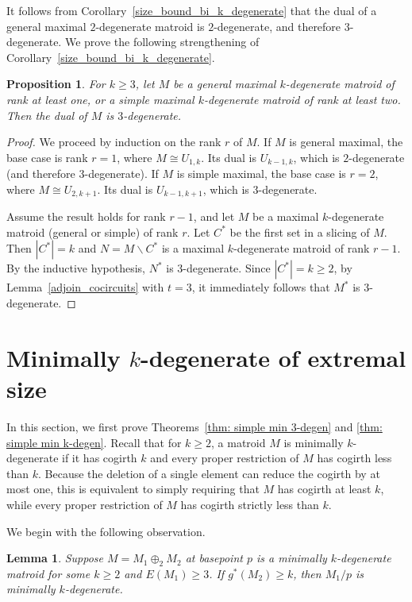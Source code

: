 \documentclass{amsart}
\newcommand{\ba}{\backslash}
\newtheorem{lemma}[theorem]{Lemma}
\newtheorem{proposition}[theorem]{Proposition}
\theoremstyle{definition}
\theoremstyle{remark}
\numberwithin{equation}{section}
\begin{document}
It follows from Corollary~\ref{size_bound_bi_k_degenerate} that the dual of a general maximal $2$-degenerate matroid is $2$-degenerate, and therefore $3$-degenerate. We prove the following strengthening of Corollary~\ref{size_bound_bi_k_degenerate}.

\begin{proposition}
\label{dual_3_degenerate}
For $k \geq 3$, let $M$ be a general maximal $k$-degenerate matroid of rank at least one, or a simple maximal $k$-degenerate matroid of rank at least two. Then the dual of $M$ is $3$-degenerate. 
\end{proposition}

\begin{proof}
We proceed by induction on the rank $r$ of $M$. If $M$ is general maximal, the base case is rank $r=1$, where $M \cong U_{1,k}$. Its dual is $U_{k-1,k}$, which is $2$-degenerate (and therefore $3$-degenerate). If $M$ is simple maximal, the base case is $r=2$, where $M \cong U_{2,k+1}$. Its dual is $U_{k-1,k+1}$, which is $3$-degenerate.

Assume the result holds for rank $r-1$, and let $M$ be a maximal $k$-degenerate matroid (general or simple) of rank $r$. 
Let $C^*$ be the first set in a slicing of $M$. Then $|C^*|=k$ and $N = M \ba C^*$ is a maximal $k$-degenerate matroid of rank $r-1$. By the inductive hypothesis, $N^*$ is $3$-degenerate. Since $|C^*| = k \ge 2$, by Lemma~\ref{adjoin_cocircuits} with $t=3$, it immediately follows that $M^*$ is $3$-degenerate.
\end{proof}


\section{\texorpdfstring{Minimally $k$-degenerate of extremal size}{Minimally k-degenerate of extremal size}}\label{sec: simple}

In this section, we first prove Theorems~\ref{thm: simple min 3-degen} and \ref{thm: simple min k-degen}. Recall that for $k \geq 2$, a matroid $M$ is minimally $k$-degenerate if it has cogirth $k$ and every proper restriction of $M$ has cogirth less than $k$. Because the deletion of a single element can reduce the cogirth by at most one, this is equivalent to simply requiring that $M$ has cogirth at least $k$, while every proper restriction of $M$ has cogirth strictly less than $k$.

We begin with the following observation.

\begin{lemma}\label{lem: contraction is mkd}
    Suppose $M=M_1\oplus_2 M_2$ at basepoint $p$ is a minimally $k$-degenerate matroid for some $k\geq 2$ and $E(M_1)\geq 3$. If $g^*(M_2) \geq k$, then $M_1/p$ is minimally $k$-degenerate.
\end{lemma}
\end{document}
